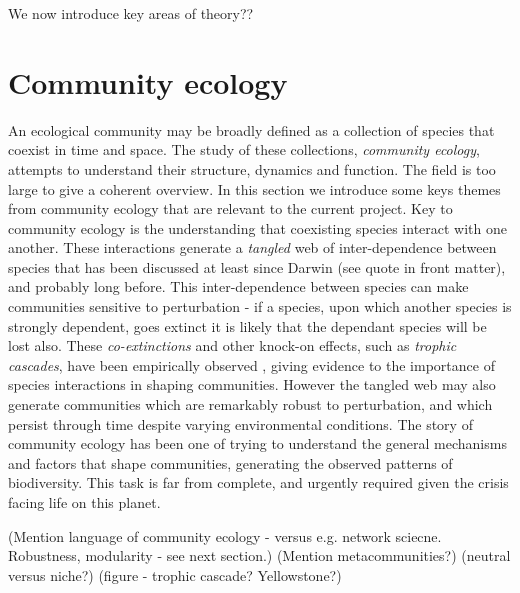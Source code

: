 We now introduce key areas of theory??
  
\section{Community ecology}
\label{sec:intro_community_ecology}

An ecological community may be broadly defined as a collection of species that coexist in time and space. The study of these collections, \emph{community ecology}, attempts to understand their structure, dynamics and function. The field is too large to give a coherent overview. In this section we introduce some keys themes from community ecology that are relevant to the current project. Key to community ecology is the understanding that coexisting species interact with one another. These interactions generate a \emph{tangled} web of inter-dependence between species that has been discussed at least since Darwin \cite{darwin2009origin} (see quote in front matter), and probably long before. This inter-dependence between species can make communities sensitive to perturbation - if a species, upon which another species is strongly dependent, goes extinct it is likely that the dependant species will be lost also. These \emph{co-extinctions} and other knock-on effects, such as \emph{trophic cascades}, have been empirically observed \cite{knight2005trophic,ripple2012trophic}, giving evidence to the importance of species interactions in shaping communities.   However the tangled web may also generate communities which are remarkably robust to perturbation, and which persist through time despite varying environmental conditions. The story of community ecology has been one of trying to understand the general mechanisms and factors that shape communities, generating the observed patterns of biodiversity. This task is far from complete, and urgently required given the crisis facing life on this planet.

(Mention language of community ecology - versus e.g. network sciecne. Robustness, modularity - see next section.)
(Mention metacommunities?)
(neutral versus niche?)
(figure - trophic cascade? Yellowstone?)



